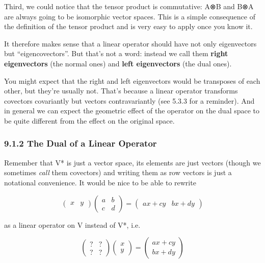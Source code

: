 \documentclass[oneside,english]{amsbook}
\numberwithin{section}{chapter}
\theoremstyle{plain}
\theoremstyle{definition}
\begin{document}
Third, we could notice that the tensor product is commutative: A⊗B and
B⊗A are always going to be isomorphic vector spaces. This is a simple
consequence of the definition of the tensor product and is very easy to
apply once you know it.

It therefore makes sense that a linear operator should have not only
eigenvectors but ``eigencovectors''. But that's not a word: instead we
call them \textbf{right eigenvectors} (the normal ones) and \textbf{left
	eigenvectors} (the dual ones).

You might expect that the right and left eigenvectors would be
transposes of each other, but they're usually not. That's because a
linear operator transforms covectors covariantly but vectors
contravariantly (see 5.3.3 for a reminder). And in general we can expect
the geometric effect of the operator on the dual space to be quite
different from the effect on the original space.

\subsubsection{9.1.2 The Dual of a Linear
	Operator}\label{the-dual-of-a-linear-operator}

Remember that V* is just a vector space, its elements are just vectors
(though we sometimes \emph{call} them covectors) and writing them as row
vectors is just a notational convenience. It would be nice to be able to
rewrite

\[\begin{pmatrix}
	x & y
\end{pmatrix}\begin{pmatrix}
	a & b \\
	c & d
\end{pmatrix} = \begin{pmatrix}
	ax + cy & bx + dy
\end{pmatrix}\]

as a linear operator on V instead of V*, i.e.

\[\begin{pmatrix}
	? & ? \\
	? & ?
\end{pmatrix}\begin{pmatrix}
	x \\
	y
\end{pmatrix} = \begin{pmatrix}
	ax + cy \\
	bx + dy
\end{pmatrix}\]
\end{document}
